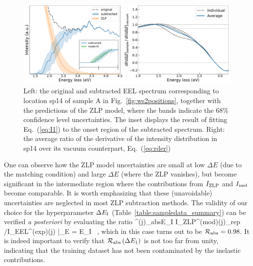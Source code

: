 \begin{figure}[t]
\begin{centering}
  \includegraphics[width=0.99\linewidth]{plots/SubtractedEELS_plot_sp14.pdf}
   \caption{Left: the original
     and subtracted EEL spectrum corresponding to location sp14 of sample A in Fig.~\ref{fig:ws2positions},
     together with the predictions of the ZLP model, where
     the bands indicate the 68\% confidence level uncertainties.
     The inset displays the result of fitting Eq.~(\ref{eq:I1}) to the onset
     region of the subtracted spectrum.
     Right: the average ratio of the derivative of the intensity
     distribution in sp14 over its vacuum counterpart, Eq.~(\ref{eq:rder})
  }
\label{fig:sp4_subtracted_spectrum}
\end{centering}
\end{figure}

One can observe how the ZLP model uncertainties are small at low $\Delta E$
(due to the matching condition) and large $\Delta E$ (where the ZLP vanishes),
but become significant in the intermediate region where the contributions
from $I_{\rm ZLP}$ and $I_{\rm inel}$ become comparable.
%
It is worth emphasizing that these (unavoidable) uncertainties are neglected in most
ZLP subtraction methods.
%
The validity of our choice for the hyperparameter $\Delta E_{\rm I}$ (Table~\ref{table:sampledata_summary})
can be verified {\it a posteriori} by evaluating the ratio
\be
{}^{(j)}_{\rm abs}\lp \Delta E_{\rm I}\rp \equiv 
\la I_{\rm ZLP}^{({\rm mod})(j)}\ra_{\rm rep} \Big/I_{\rm EEL}^{({\rm exp})(j)} \Big|_{\Delta E = \Delta E_{\rm I}} \, ,
\ee
which in this case turns out to be $\mathcal{R}_{\rm abs} = 0.98$.
%
It is indeed important to verify that $\mathcal{R}_{\rm abs}\left( \Delta E_1\right)$ is not too far from unity,
indicating that the training dataset has not been contaminated by the inelastic contributions.

